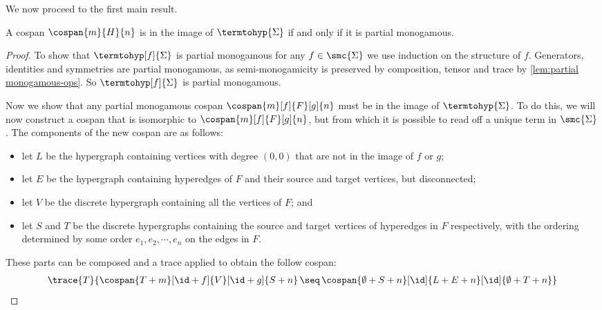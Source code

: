 \noindent
We now proceed to the first main result.

\begin{proposition}\label{prop:termtohyp-image}
    A cospan \(\cospan{m}{H}{n}\) is in the image of \(\termtohyp{\Sigma}\) if
    and only if it is partial monogamous.
\end{proposition}
\begin{proof}
    To show that \(\termtohyp[f]{\Sigma}\) is partial monogamous for any
    \(f \in \smc{\Sigma}\) we use induction on the structure of \(f\).
    Generators, identities and symmetries are partial monogamous, as
    semi-monogamicity is preserved by composition, tensor and trace by
    \cref{lem:partial monogamous-ops}.
    So \(\termtohyp[f]{\Sigma}\) is partial monogamous.

    Now we show that any partial monogamous cospan \(\cospan{m}[f]{F}[g]{n}\)
    must be in the image of \(\termtohyp{\Sigma}\).
    To do this, we will now construct a cospan that is isomorphic to
    \(\cospan{m}[f]{F}[g]{n}\), but from which it is possible to read off a
    unique term in \(\smc{\Sigma}\).
    The components of the new cospan are as follows:
    \begin{itemize}
        \item let \(L\) be the hypergraph containing vertices with degree
                \((0,0)\) that are not in the image of \(f\) or \(g\);
        \item let \(E\) be the hypergraph containing hyperedges of \(F\) and
                their source and target vertices, but disconnected;
        \item let \(V\) be the discrete hypergraph containing all the vertices
                of \(F\); and
        \item let \(S\) and \(T\) be the discrete hypergraphs containing the
                source and target vertices of hyperedges in \(F\) respectively,
                with the ordering determined by some order
                \(e_1,e_2,\cdots,e_n\) on the edges in \(F\).
    \end{itemize}

    \noindent
    These parts can be composed and a trace applied to obtain the follow cospan:
    \begin{gather}
        \trace{T}{
            \cospan{T + m}[\id + f]{V}[\id + g]{S + n}
            \,\seq\,
            \cospan{\emptyset + S + n}[\id]{L + E + n}[\id]{\emptyset + T + n}
        }
        \label{gat:cospan}
    \end{gather}


\end{proof}
